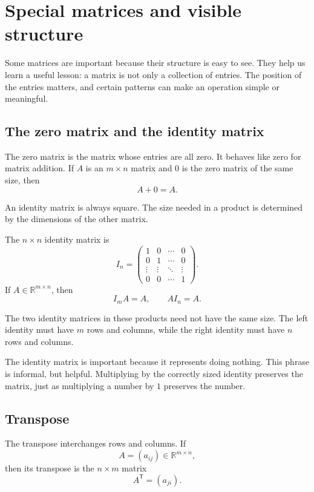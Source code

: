 \section{Special matrices and visible structure}

Some matrices are important because their structure is easy to see. They help us learn a useful lesson: a matrix is not only a collection of entries. The position of the entries matters, and certain patterns can make an operation simple or meaningful.

\subsection*{The zero matrix and the identity matrix}

The zero matrix is the matrix whose entries are all zero. It behaves like zero for matrix addition. If \(A\) is an \(m\times n\) matrix and \(0\) is the zero matrix of the same size, then
\[
A+0=A.
\]

An identity matrix is always square. The size needed in a product is determined by the dimensions of the other matrix.

\begin{definitionbox}
The \(n\times n\) identity matrix is
\[
I_n=
\begin{pmatrix}
1 & 0 & \cdots & 0\\
0 & 1 & \cdots & 0\\
\vdots & \vdots & \ddots & \vdots\\
0 & 0 & \cdots & 1
\end{pmatrix}.
\]
If \(A\in\mathbb{R}^{m\times n}\), then
\[
I_mA=A,
\qquad
AI_n=A.
\]
\end{definitionbox}

The two identity matrices in these products need not have the same size. The left identity must have \(m\) rows and columns, while the right identity must have \(n\) rows and columns.

The identity matrix is important because it represents doing nothing. This phrase is informal, but helpful. Multiplying by the correctly sized identity preserves the matrix, just as multiplying a number by \(1\) preserves the number.

\subsection*{Transpose}

The transpose interchanges rows and columns. If
\[
A=(a_{ij})\in\mathbb{R}^{m\times n},
\]
then its transpose is the \(n\times m\) matrix
\[
A^{\mathsf T}=(a_{ji}).
\]

